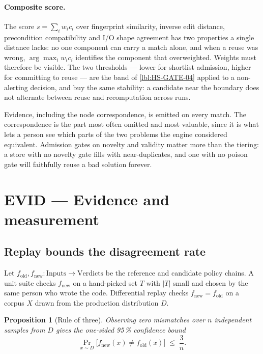 \documentclass[11pt]{article}
\newtheorem{prop}{Proposition}[section]
\begin{document}
\paragraph{Composite score.} The score $s = \sum_i w_i c_i$ over fingerprint
similarity, inverse edit distance, precondition compatibility and I/O shape
agreement has two properties a single distance lacks: no one component can
carry a match alone, and when a reuse was wrong, $\arg\max_i w_i c_i$ identifies
the component that overweighted. Weights must therefore be visible. The two
thresholds --- lower for shortlist admission, higher for committing to reuse
--- are the band of \ref{lbl:HS-GATE-04} applied to a non-alerting decision,
and buy the same stability: a candidate near the boundary does not alternate
between reuse and recomputation across runs.

Evidence, including the node correspondence, is emitted on every match. The
correspondence is the part most often omitted and most valuable, since it is
what lets a person see which parts of the two problems the engine considered
equivalent. Admission gates on novelty and validity matter more than the
tiering: a store with no novelty gate fills with near-duplicates, and one with
no poison gate will faithfully reuse a bad solution forever.

\section{EVID --- Evidence and measurement}

\subsection{Replay bounds the disagreement rate}
\label{lbl:HS-EVID-01}

Let $f_{\mathrm{old}}, f_{\mathrm{new}} : \mathrm{Inputs} \to \mathrm{Verdicts}$
be the reference and candidate policy chains. A unit suite checks
$f_{\mathrm{new}}$ on a hand-picked set $T$ with $|T|$ small and chosen by the
same person who wrote the code. Differential replay checks
$f_{\mathrm{new}} = f_{\mathrm{old}}$ on a corpus $X$ drawn from the production
distribution $D$.

\begin{prop}[Rule of three]
Observing zero mismatches over $n$ independent samples from $D$ gives the
one-sided 95\,\% confidence bound
\begin{equation}
\Pr_{x \sim D}\big[f_{\mathrm{new}}(x) \neq f_{\mathrm{old}}(x)\big] \;\le\;
\frac{3}{n}.
\end{equation}
\end{prop}
\end{document}
